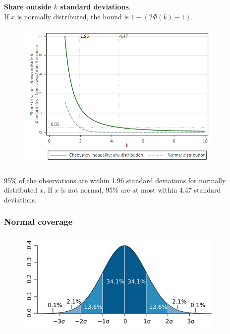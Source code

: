 \documentclass[a4paper,12pt]{article}
\begin{document}
\textbf{Share outside $k$ standard deviations}.\\
If $x$ is normally distributed, the bound is $1-(2\Phi(k)-1)$.
\begin{figure}[H]
\begin{center}
{\includegraphics[width=0.9\textwidth]{figures/chebyshev_inequality_pdf}}\label{chebyshev_inequality_pdf}
\end{center}
\end{figure}
95\% of the observations are within 1.96 standard deviations for normally distributed $x$. If $x$ is not normal, 95\% are at most within 4.47 standard deviations.


\subsubsection*{Normal coverage}

\begin{figure}[H]
	\centering
		\includegraphics[width=0.90\textwidth]{figures/Standard_deviation_diagram}
	\label{fig:Standard_deviation_diagram}
\end{figure}
\end{document}
